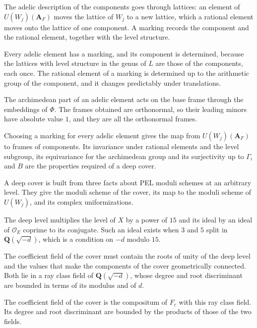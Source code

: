 The adelic description of the components goes through lattices: an element of $U(W_j)(\mathbf A_F)$ moves
the lattice of $W_j$ to a new lattice, which a rational element moves onto the lattice of one component.
A marking records the component and the rational element, together with the level structure.

Every adelic element has a marking, and its component is determined, because the lattices with level
structure in the genus of $L$ are those of the components, each once. The rational element of a marking
is determined up to the arithmetic group of the component, and it changes predictably under
translations.

The archimedean part of an adelic element acts on the base frame through the embeddings of $\Phi$. The
frames obtained are orthonormal, so their leading minors have absolute value $1$, and they are all the
orthonormal frames.

Choosing a marking for every adelic element gives the map from $U(W_j)(\mathbf A_F)$ to frames of
components. Its invariance under rational elements and the level subgroup, its equivariance for the
archimedean group and its surjectivity up to $\Gamma_i$ and $B$ are the properties required of a deep
cover.

A deep cover is built from three facts about PEL moduli schemes at an arbitrary level. They
give the moduli scheme of the cover, its map to the moduli scheme of $U(W_j)$, and its complex
uniformizations.

The deep level multiplies the level of $X$ by a power of $15$ and its ideal by an ideal of
$\mathcal O_E$ coprime to its conjugate. Such an ideal exists when $3$ and $5$ split in
$\mathbf Q(\sqrt{-d})$, which is a condition on $-d$ modulo $15$.

The coefficient field of the cover must contain the roots of unity of the deep level and the values
that make the components of the cover geometrically connected. Both lie in a ray class field of
$\mathbf Q(\sqrt{-d})$, whose degree and root discriminant are bounded in terms of its modulus and
of $d$.

The coefficient field of the cover is the compositum of $F_c$ with this ray class field. Its degree
and root discriminant are bounded by the products of those of the two fields.

